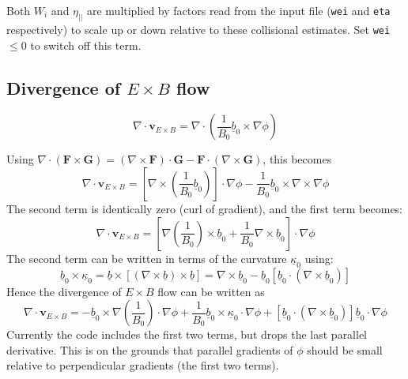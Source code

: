 \documentclass[12pt]{article}
\newcommand{\Vec}[1]{\ensuremath{\mathbf{#1}}}
\newcommand{\bvec}{\ensuremath{\underline{b}}}
\newcommand{\kvec}{\ensuremath{\underline{\kappa}}}
\begin{document}
Both $W_i$ and $\eta_{||}$ are multiplied by factors read from the input file (\texttt{wei} and \texttt{eta} respectively) to scale up or down relative to these collisional estimates. Set \texttt{wei} $\le 0$ to switch off this term.

\subsection{Divergence of $E\times B$ flow}

\[
\nabla\cdot\Vec{v}_{E\times B} = \nabla\cdot\left(\frac{1}{B_0}\bvec_0\times\nabla\phi\right)
\]

Using $\nabla\cdot\left(\Vec{F}\times\Vec{G}\right) = \left(\nabla\times\Vec{F}\right)\cdot\Vec{G} - \Vec{F}\cdot\left(\nabla\times\Vec{G}\right)$, this becomes
\[
\nabla\cdot\Vec{v}_{E\times B} = \left[\nabla\times\left(\frac{1}{B_0}\bvec_0\right)\right]\cdot\nabla\phi - \frac{1}{B_0}\bvec_0\times\nabla\times\nabla\phi
\]
The second term is identically zero (curl of gradient), and the first term becomes:
\[
\nabla\cdot\Vec{v}_{E\times B} = \left[\nabla\left(\frac{1}{B_0}\right)\times\bvec_0 + \frac{1}{B_0}\nabla\times\bvec_0\right]\cdot\nabla\phi
\]
The second term can be written in terms of the curvature $\kvec_0$ using:
\[
\bvec_0\times\kvec_0 = \bvec\times\left[\left(\nabla\times\bvec\right)\times\bvec\right] = \nabla\times\bvec_0 - \bvec_0\left[\bvec_0\cdot\left(\nabla\times\bvec_0\right)\right]
\]
Hence the divergence of $E\times B$ flow can be written as
\[
\nabla\cdot\Vec{v}_{E\times B} = -\bvec_0\times\nabla\left(\frac{1}{B_0}\right)\cdot\nabla\phi + \frac{1}{B_0}\bvec_0\times\kvec_0\cdot\nabla\phi + \left[\bvec_0\cdot\left(\nabla\times\bvec_0\right)\right]\bvec_0\cdot\nabla\phi
\]
Currently the code includes the first two terms, but drops the last parallel
derivative. This is on the grounds that parallel gradients of $\phi$ should
be small relative to perpendicular gradients (the first two terms).
\end{document}
